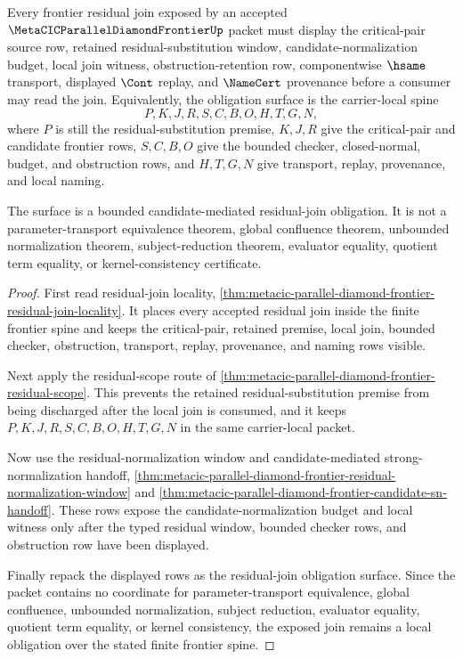 \begin{theorem}
\label{thm:metacic-parallel-diamond-frontier-residual-join-obligations}
Every frontier residual join exposed by an accepted $\MetaCICParallelDiamondFrontierUp$ packet must display the critical-pair source row, retained residual-substitution window, candidate-normalization budget, local join witness, obstruction-retention row, componentwise $\hsame$ transport, displayed $\Cont$ replay, and $\NameCert$ provenance before a consumer may read the join. Equivalently, the obligation surface is the carrier-local spine
$$
P,K,J,R,S,C,B,O,H,T,G,N ,
$$
where $P$ is still the residual-substitution premise, $K,J,R$ give the critical-pair and candidate frontier rows, $S,C,B,O$ give the bounded checker, closed-normal, budget, and obstruction rows, and $H,T,G,N$ give transport, replay, provenance, and local naming.

The surface is a bounded candidate-mediated residual-join obligation. It is not a parameter-transport equivalence theorem, global confluence theorem, unbounded normalization theorem, subject-reduction theorem, evaluator equality, quotient term equality, or kernel-consistency certificate.
\end{theorem}
\begin{proof}
First read residual-join locality,
\autoref{thm:metacic-parallel-diamond-frontier-residual-join-locality}. It places every accepted residual join inside the finite frontier spine and keeps the critical-pair, retained premise, local join, bounded checker, obstruction, transport, replay, provenance, and naming rows visible.

Next apply the residual-scope route of \autoref{thm:metacic-parallel-diamond-frontier-residual-scope}. This prevents the retained residual-substitution premise from being discharged after the local join is consumed, and it keeps $P,K,J,R,S,C,B,O,H,T,G,N$ in the same carrier-local packet.

Now use the residual-normalization window and candidate-mediated strong-normalization handoff, \autoref{thm:metacic-parallel-diamond-frontier-residual-normalization-window} and \autoref{thm:metacic-parallel-diamond-frontier-candidate-sn-handoff}. These rows expose the candidate-normalization budget and local witness only after the typed residual window, bounded checker rows, and obstruction row have been displayed.

Finally repack the displayed rows as the residual-join obligation surface. Since the packet contains no coordinate for parameter-transport equivalence, global confluence, unbounded normalization, subject reduction, evaluator equality, quotient term equality, or kernel consistency, the exposed join remains a local obligation over the stated finite frontier spine.
\end{proof}

